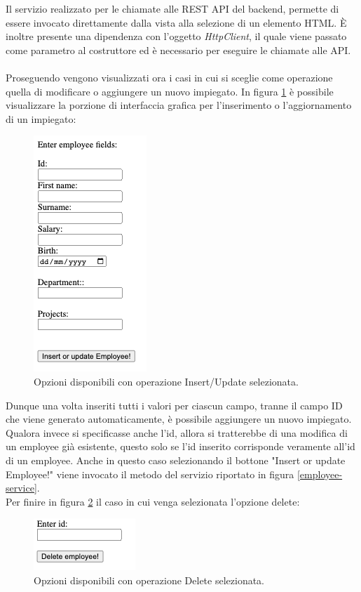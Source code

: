 \FloatBarrier
Il servizio realizzato per le chiamate alle REST API del backend, permette di essere invocato direttamente dalla vista alla selezione di un elemento HTML. È inoltre presente una dipendenza con l'oggetto \textit{HttpClient}, il quale viene passato come parametro al costruttore ed è necessario per eseguire le chiamate alle API.\\\\
Proseguendo vengono visualizzati ora i casi in cui si sceglie come operazione quella di modificare o aggiungere un nuovo impiegato. In figura \ref{post-employee} è possibile visualizzare la porzione di interfaccia grafica per l'inserimento o l'aggiornamento di un impiegato:
\FloatBarrier
\begin{figure}[!ht]
\centering
\includegraphics[width=0.3\linewidth]{immagini/postEmployee.png}
\caption{Opzioni disponibili con operazione Insert/Update selezionata.}
\label{post-employee}
\end{figure}
\FloatBarrier
Dunque una volta inseriti tutti i valori per ciascun campo, tranne il campo ID che viene generato automaticamente, è possibile aggiungere un nuovo impiegato. Qualora invece si specificasse anche l'id, allora si tratterebbe di una modifica di un employee già esistente, questo solo se l'id inserito corrisponde veramente all'id di un employee. Anche in questo caso selezionando il bottone "Insert or update Employee!" viene invocato il metodo del servizio riportato in figura \ref{employee-service}.\\
Per finire in figura \ref{delete-employee} il caso in cui venga selezionata l'opzione delete:
\FloatBarrier
\begin{figure}[!ht]
\centering
\includegraphics[width=0.3\linewidth]{immagini/deleteEmployee.png}
\caption{Opzioni disponibili con operazione Delete selezionata.}
\label{delete-employee}
\end{figure}
\FloatBarrier
